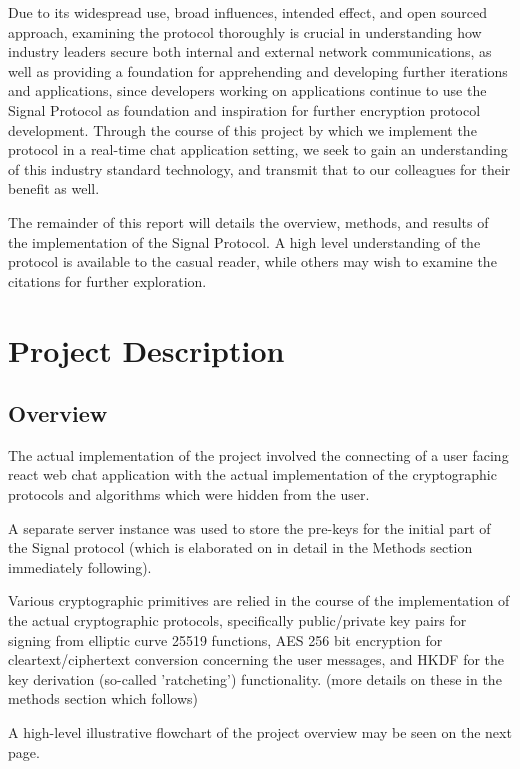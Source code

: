 \documentclass[12pt]{article}
\begin{document}
\par %
Due to its widespread use, broad influences, intended effect, and open sourced approach, examining the protocol thoroughly is crucial in understanding how industry leaders secure both internal and external network communications, as well as providing a foundation for apprehending and developing further iterations and applications, since developers working on applications continue to use the Signal Protocol as foundation and inspiration for further encryption protocol development.\parencite{website:global-adoption}\parencite{website:viber}\parencite{website:forsta}\parencite{website:forsta-gh} Through the course of this project by which we implement the protocol in a real-time chat application setting, we seek to gain an understanding of this industry standard technology, and transmit that to our colleagues for their benefit as well. 

\par%
The remainder of this report will details the overview, methods, and results of the implementation of the Signal Protocol. A high level understanding of the protocol is available to the casual reader, while others may wish to examine the citations for further exploration.


\newpage
\section{Project Description}

\subsection{Overview}
The actual implementation of the project involved the connecting of a user facing react web chat application with the actual implementation of the cryptographic protocols and algorithms which were hidden from the user.
\par A separate server instance was used to store the pre-keys for the initial part of the Signal protocol (which is elaborated on in detail in the Methods section immediately following). 
\par Various cryptographic primitives are relied in the course of the implementation of the actual cryptographic protocols, specifically public/private key pairs for signing from elliptic curve 25519 functions, AES 256 bit encryption for cleartext/ciphertext conversion concerning the user messages, and HKDF for the key derivation (so-called 'ratcheting') functionality. (more details on these in the methods section which follows)
\par A high-level illustrative flowchart of the project overview may be seen on the next page.
\end{document}

